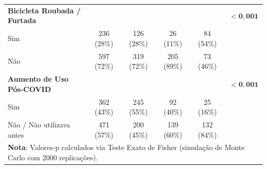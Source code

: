 \documentclass[12pt]{article}
\begin{document}
\begin{table}[htbp]
{\begin{tabular}{@{}lccccc@{}}
\textbf{Bicicleta Roubada / Furtada} & & & & & $\mathbf{< 0,001}$ \\
\quad Sim & 236 (28\%) & 126 (28\%) & 26 (11\%) & 84 (54\%) & \\
\quad Não & 597 (72\%) & 319 (72\%) & 205 (89\%) & 73 (46\%) & \\

\textbf{Aumento de Uso Pós-COVID} & & & & & $\mathbf{< 0,001}$ \\
\quad Sim & 362 (43\%) & 245 (55\%) & 92 (40\%) & 25 (16\%) & \\
\quad Não / Não utilizava antes & 471 (57\%) & 200 (45\%) & 139 (60\%) & 132 (84\%) & \\
\bottomrule
\multicolumn{6}{l}{\footnotesize \textbf{Nota}: Valores-p calculados via Teste Exato de Fisher (simulação de Monte Carlo com 2000 replicações).} \\
\end{tabular}%
}
\end{table}





\end{document}
